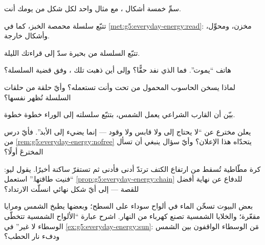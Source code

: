 \begin{exercise}[$\star$]\label{exo:g5:everyday-energy:3}
سمِّ خمسة أشكال ، مع مثال واحد لكل شكل من
يومك أنت.
\end{exercise}

\begin{exercise}[$\star$]\label{exo:g5:everyday-energy:4}
تتبّع سلسلة  محمصة الخبز، كما في
\cref{met:g5:everyday-energy:read}: مخزن، ومحوِّل، وأشكال
خارجة.
\end{exercise}

\begin{exercise}[$\star$]\label{exo:g5:everyday-energy:5}
تتبّع السلسلة من بحيرة سدّ إلى  قراءتك الليلة.
\end{exercise}

\begin{exercise}[$\star$]\label{exo:g5:everyday-energy:6}
هاتف ``يموت''. فما الذي نفد حقًّا؟ وإلى أين ذهبت تلك ،
وفق قضية السلسلة؟
\end{exercise}

\begin{exercise}[$\star$]\label{exo:g5:everyday-energy:7}
لماذا يسخن الحاسوب المحمول من تحت وأنت تستعمله؟ وأيّ حلقة من
حلقات السلسلة تُظهر نفسها؟
\end{exercise}

\begin{exercise}[$\star$]\label{exo:g5:everyday-energy:8}
بيّن أن القارب الشراعي يعمل  الشمس، بتتبّع سلسلته إلى
الوراء خطوة خطوة.
\end{exercise}

\begin{exercise}[$\star\star$]\label{exo:g5:everyday-energy:9}
يعلن مخترع عن  ``لا يحتاج إلى  ولا قابس ولا وقود ---
إنما يضيء إلى الأبد''. فأيّ درس من
\cref{rem:g5:everyday-energy:nofree} يتحدّاه هذا الإعلان؟ وأيّ
سؤال ينبغي أن تسأل المخترعَ أولًا؟
\end{exercise}

\begin{exercise}[$\star\star$]\label{exo:g5:everyday-energy:10}
كرة مطّاطية تُسقط من ارتفاع الكتف ترتدّ أدنى فأدنى ثم تستقرّ
ساكنة أخيرًا. يقول ليو: ``فنيت طاقتها.'' استعمل
\cref{prop:g5:everyday-energy:chain} للدفاع عن نهاية أفضل
للقصة --- إلى أيّ شكل نهائي انسلّت  الارتداد؟
\end{exercise}

\begin{exercise}[$\star\star$]\label{exo:g5:everyday-energy:11}
بعض البيوت تسخّن الماء في ألواح سوداء على السطح؛ وبعضها يطبخ
 الشمس ومرايا مقعّرة؛ والخلايا الشمسية تصنع كهرباء من 
النهار. اشرح عبارة ``الألواح الشمسية تتخطّى الوسطاء لا غير'' في
\cref{ex:g5:everyday-energy:sun}: مَن الوسطاء الواقفون بين
الشمس ودفء نار الحطب؟
\end{exercise}
